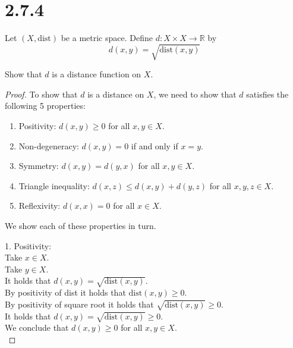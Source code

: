 \documentclass{article}
\theoremstyle{mytheoremstyle}
\theoremstyle{mytheoremstyle}
\theoremstyle{myproblemstyle}
\begin{document}
    \newpage

    \section{2.7.4}
    \begin{problem}
        Let $(X, \text{dist})$ be a metric space. Define $d: X \times X \to \mathbb{R}$ by
        $$d(x,y) = \sqrt{\text{dist}(x,y)}$$

        Show that $d$ is a distance function on $X$.
    \end{problem}

    \begin{proof}
        To show that $d$ is a distance on $X$, we need to show that $d$ satisfies the following 5 properties:
        \begin{enumerate}
            \item Positivity: $d(x,y) \geq 0$ for all $x,y \in X$.
            \item Non-degeneracy: $d(x,y) = 0$ if and only if $x = y$.
            \item Symmetry: $d(x,y) = d(y,x)$ for all $x,y \in X$.
            \item Triangle inequality: $d(x,z) \leq d(x,y) + d(y,z)$ for all $x,y,z \in X$.
            \item Reflexivity: $d(x,x) = 0$ for all $x \in X$.
        \end{enumerate}

        We show each of these properties in turn.

        1. Positivity: \\
        Take $x \in X$. \\
        Take $y \in X$. \\
        It holds that $d(x,y) = \sqrt{\text{dist}(x,y)}$. \\
        By positivity of dist it holds that $\text{dist}(x,y) \geq 0$. \\
        By positivity of square root it holds that $\sqrt{\text{dist}(x,y)} \geq 0$. \\
        It holds that $d(x,y) = \sqrt{\text{dist}(x,y)} \geq 0$. \\
        We conclude that $d(x,y) \geq 0$ for all $x,y \in X$. \\


\end{proof}
\end{document}
